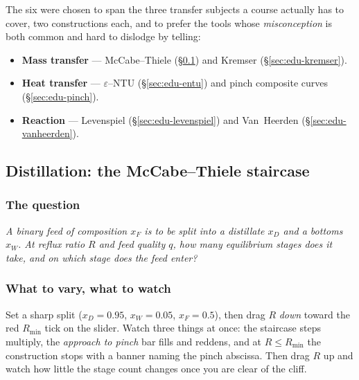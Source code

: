 \documentclass[11pt,a4paper]{article}
\begin{document}
The six were chosen to span the three transfer subjects a course actually
has to cover, two constructions each, and to prefer the tools whose
\emph{misconception} is both common and hard to dislodge by telling:

\begin{itemize}[leftmargin=*,nosep]
  \item \textbf{Mass transfer} --- McCabe--Thiele
        (\S\ref{sec:edu-mccabe}) and Kremser (\S\ref{sec:edu-kremser}).
  \item \textbf{Heat transfer} --- $\varepsilon$--NTU
        (\S\ref{sec:edu-entu}) and pinch composite curves
        (\S\ref{sec:edu-pinch}).
  \item \textbf{Reaction} --- Levenspiel (\S\ref{sec:edu-levenspiel}) and
        Van~Heerden (\S\ref{sec:edu-vanheerden}).
\end{itemize}

\subsection{Distillation: the McCabe--Thiele staircase}\label{sec:edu-mccabe}


\subsubsection*{The question}

\emph{A binary feed of composition $x_F$ is to be split into a distillate
$x_D$ and a bottoms $x_W$.  At reflux ratio $R$ and feed quality $q$, how
many equilibrium stages does it take, and on which stage does the feed
enter?}

\subsubsection*{What to vary, what to watch}

\begin{tryit}
Set a sharp split ($x_D = 0.95$, $x_W = 0.05$, $x_F = 0.5$), then drag
$R$ \emph{down} toward the red $R_{\min}$ tick on the slider.  Watch three
things at once: the staircase steps multiply, the \emph{approach to pinch}
bar fills and reddens, and at $R \le R_{\min}$ the construction stops
with a banner naming the pinch abscissa.  Then drag $R$ up and watch how
little the stage count changes once you are clear of the cliff.
\end{tryit}
\end{document}
